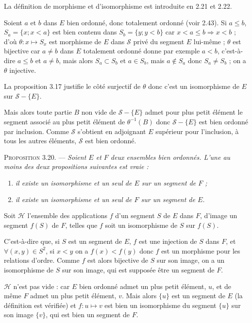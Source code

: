 La définition de morphisme et d'isomorphisme est introduite en 2.21 et 2.22.

Soient $a$ et $b$ dans $E$ bien ordonné, donc totalement ordonné (voir 2.43). Si $a\le b$, $S_a=\{x;x<a\}$ est bien contenu dans $S_b=\{y;y<b\}$ car $x<a\le b\Rightarrow x<b$ ; d'où $\theta:x\mapsto S_x$ est morphisme de $E$ dans $\mathcal S$ privé du segment $E$ lui-même ; $\theta$ est bijective car $a\ne b$ dans $E$ totalement ordonné donne par exemple $a<b$, c'est-à-dire $a\le b$ et $a\ne b$, mais alors $S_a\subset S_b$ et $a\in S_b$, mais $a\notin S_a$ donc $S_a\ne S_b$ ; on a $\theta$ injective.

La proposition 3.17 justifie le côté surjectif de $\theta$ donc c'est un isomorphisme de $E$ sur $\mathcal S-\{E\}$.

Mais alors toute partie $B$ non vide de $\mathcal S-\{E\}$ admet pour plus petit élément le segment associé au plus petit élément de $\theta^{-1}(B)$ donc $\mathcal S-\{E\}$ est bien ordonné par inclusion. Comme $\mathcal S$ s'obtient en adjoignant $E$ supérieur pour l'inclusion, à tous les autres éléments, $\mathcal S$ est bien ordonné. \bookend

\medskip\noindent\textsc{Proposition 3.20.} --- \emph{Soient $E$ et $F$ deux ensembles bien ordonnés. L'une au moins des deux propositions suivantes est vraie :}
\begin{enumerate}[label=\arabic*)]
\item \emph{il existe un isomorphisme et un seul de $E$ sur un segment de $F$ ;}
\item \emph{il existe un isomorphisme et un seul de $F$ sur un segment de $E$.}
\end{enumerate}

Soit $\mathcal H$ l'ensemble des applications $f$ d'un segment $S$ de $E$ dans $F$, d'image un segment $f(S)$ de $F$, telles que $f$ soit un isomorphisme de $S$ sur $f(S)$.

C'est-à-dire que, si $S$ est un segment de $E$, $f$ est une injection de $S$ dans $F$, et $\forall(x,y)\in S^2$, si $x<y$ on a $f(x)<f(y)$ donc $f$ est un morphisme pour les relations d'ordre. Comme $f$ est alors bijective de $S$ sur son image, on a un isomorphisme de $S$ sur son image, qui est supposée être un segment de $F$.

$\mathcal H$ n'est pas vide : car $E$ bien ordonné admet un plus petit élément, $u$, et de même $F$ admet un plus petit élément, $v$. Mais alors $\{u\}$ est un segment de $E$ (la définition est vérifiée) et $f:u\mapsto v$ est bien un isomorphisme du segment $\{u\}$ sur son image $\{v\}$, qui est bien un segment de $F$.

